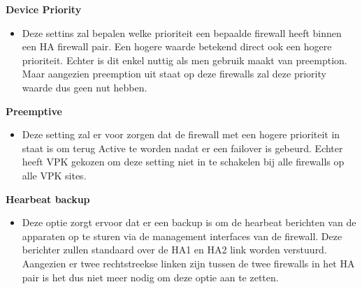 \textbf{Device Priority}
    \begin{itemize}[label=\textbullet]
        \item Deze settins zal bepalen welke prioriteit een bepaalde firewall heeft binnen een HA firewall pair. Een hogere waarde betekend direct ook een hogere prioriteit. Echter is dit enkel nuttig als men gebruik maakt van preemption. Maar aangezien preemption uit staat op deze firewalls zal deze priority waarde dus geen nut hebben.
    \end{itemize}



\textbf{Preemptive}
    \begin{itemize}[label=\textbullet]
        \item Deze setting zal er voor zorgen dat de firewall met een hogere prioriteit in staat is om terug Active te worden nadat er een failover is gebeurd. Echter heeft VPK gekozen om deze setting niet in te schakelen bij alle firewalls op alle VPK sites.
    \end{itemize}



\textbf{Hearbeat backup}
    \begin{itemize}[label=\textbullet]
        \item Deze optie zorgt ervoor dat er een backup is om de hearbeat berichten van de apparaten op te sturen via de management interfaces van de firewall. Deze berichter zullen standaard over de HA1 en HA2 link worden verstuurd. Aangezien er twee rechtstreekse linken zijn tussen de twee firewalls in het HA pair is het dus niet meer nodig om deze optie aan te zetten.
    \end{itemize}


